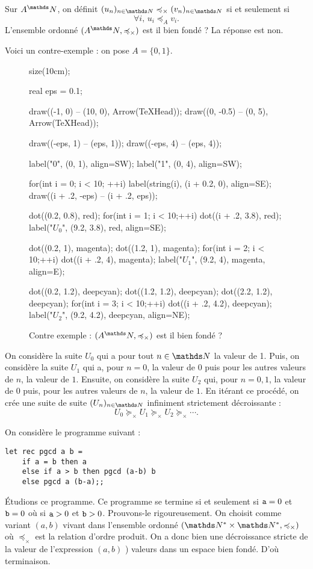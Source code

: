 \begin{rmk}
	Sur $A^\N$, on définit $(u_n)_{n\in\N} \preceq_{\times} (v_n)_{n\in\N}$\/ si et seulement si \[
		\forall i,\, u_i \preceq_A v_i
	.\]
	L'ensemble ordonné $(A^\N, \preceq_\times)$\/ est il bien fondé ? La réponse est non.

	Voici un contre-exemple : on pose $A = \{0, 1\}$.

	\begin{figure}[H]
		\centering
		\begin{asy}
			size(10cm);

			real eps = 0.1;

			draw((-1, 0) -- (10, 0), Arrow(TeXHead));
			draw((0, -0.5) -- (0, 5), Arrow(TeXHead));

			draw((-eps, 1) -- (eps, 1));
			draw((-eps, 4) -- (eps, 4));

			label("0", (0, 1), align=SW);
			label("1", (0, 4), align=SW);

			for(int i = 0; i < 10; ++i) {
				label(string(i), (i + 0.2, 0), align=SE);
				draw((i + .2, -eps) -- (i + .2, eps));
			}

			dot((0.2, 0.8), red);
			for(int i = 1; i < 10;++i) dot((i + .2, 3.8), red);
			label("$U_0$", (9.2, 3.8), red, align=SE);

			dot((0.2, 1), magenta);
			dot((1.2, 1), magenta);
			for(int i = 2; i < 10;++i) dot((i + .2, 4), magenta);
			label("$U_1$", (9.2, 4), magenta, align=E);

			dot((0.2, 1.2), deepcyan);
			dot((1.2, 1.2), deepcyan);
			dot((2.2, 1.2), deepcyan);
			for(int i = 3; i < 10;++i) dot((i + .2, 4.2), deepcyan);
			label("$U_2$", (9.2, 4.2), deepcyan, align=NE);
		\end{asy}
		\caption{Contre exemple : $(A^\N, \preceq_\times)$\/ est il bien fondé ?}
	\end{figure}
	On considère la suite $U_0$\/ qui a pour tout $n \in \N$\/ la valeur de 1.
	Puis, on considère la suite $U_1$\/ qui a, pour $n = 0$, la valeur de 0 puis pour les autres valeurs de $n$, la valeur de $1$.
	Ensuite, on considère la suite $U_2$\/ qui, pour $n = 0,1$, la valeur de 0 puis, pour les autres valeurs de $n$, la valeur de $1$.
	En itérant ce procédé, on crée une suite de suite $(U_n)_{n \in \N}$\/ infiniment strictement décroissante : \[
		U_0 \succeq_\times  U_1 \succeq_\times  U_2 \succeq_\times \cdots
	.\]
\end{rmk}

On considère le programme suivant :
\begin{lstlisting}[language=caml, caption=Calcul du PGCD]
let rec pgcd a b =
	if a = b then a
	else if a > b then pgcd (a-b) b
	else pgcd a (b-a);;
\end{lstlisting}
Étudions ce programme.
Ce programme se termine si et seulement si ${\tt a} = 0$\/ et ${\tt b} = 0$\/ où si ${\tt a} > 0$\/ et ${\tt b} > 0$.
Prouvons-le rigoureusement. On choisit comme variant $(a,b)$\/ vivant dans l'ensemble ordonné $(\N^*\times \N^*, \preceq_\times)$\/ où $\preceq_{\times}$\/ est la relation d'ordre produit.
On a donc bien une décroissance stricte de la valeur de l'expression $(a,b)$\/ ) valeurs dans un espace bien fondé. D'où terminaison.

